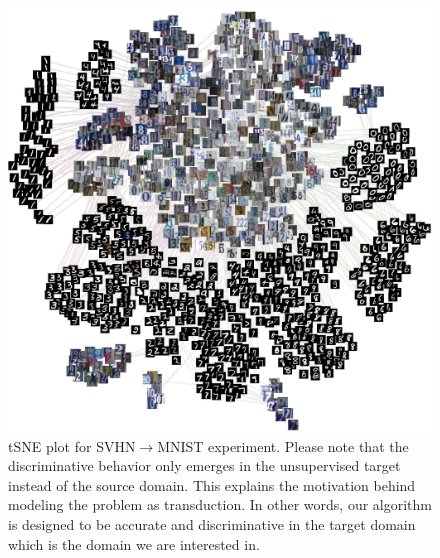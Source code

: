 \begin{figure}[ht]
    \label{fig:tsne}
        \includegraphics[width=\textwidth]{out_im.png}
        \vspace{-5mm}
\caption{tSNE plot for SVHN$\rightarrow$MNIST experiment. Please note that the discriminative behavior only emerges in the unsupervised target instead of the source domain. This explains the motivation behind modeling the problem as transduction. In other words, our algorithm is designed to be accurate and discriminative in the target domain which is the domain we are interested in.  }
\label{fig:tsnedigit}
\end{figure}
